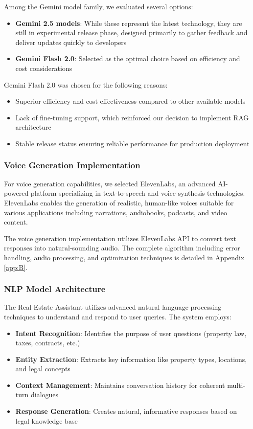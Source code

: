 Among the Gemini model family, we evaluated several options:
\begin{itemize}
    \item \textbf{Gemini 2.5 models}: While these represent the latest technology, they are still in experimental release phase, designed primarily to gather feedback and deliver updates quickly to developers
    \item \textbf{Gemini Flash 2.0}: Selected as the optimal choice based on efficiency and cost considerations
\end{itemize}

Gemini Flash 2.0 was chosen for the following reasons:
\begin{itemize}
    \item Superior efficiency and cost-effectiveness compared to other available models
    \item Lack of fine-tuning support, which reinforced our decision to implement RAG architecture
    \item Stable release status ensuring reliable performance for production deployment
\end{itemize}

\subsubsection{Voice Generation Implementation}
For voice generation capabilities, we selected ElevenLabs, an advanced AI-powered platform specializing in text-to-speech and voice synthesis technologies. ElevenLabs enables the generation of realistic, human-like voices suitable for various applications including narrations, audiobooks, podcasts, and video content.

The voice generation implementation utilizes ElevenLabs API to convert text responses into natural-sounding audio. The complete algorithm including error handling, audio processing, and optimization techniques is detailed in Appendix \ref{app:B}.


\subsubsection{NLP Model Architecture}
The Real Estate Assistant utilizes advanced natural language processing techniques to understand and respond to user queries. The system employs:

\begin{itemize}
    \item \textbf{Intent Recognition}: Identifies the purpose of user questions (property law, taxes, contracts, etc.)
    \item \textbf{Entity Extraction}: Extracts key information like property types, locations, and legal concepts
    \item \textbf{Context Management}: Maintains conversation history for coherent multi-turn dialogues
    \item \textbf{Response Generation}: Creates natural, informative responses based on legal knowledge base
\end{itemize}

